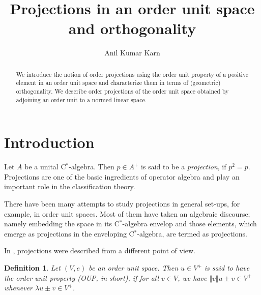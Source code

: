 \documentclass[12pt]{amsart}
\newtheorem{definition}[theorem]{Definition}
\begin{document}
	
\title[Projections and orthogonality]{Projections in an order unit space and orthogonality}
\author{Anil Kumar Karn}
	
\address{School of Mathematical Sciences, National Institute of Science Education and Research Bhubaneswar, An OCC of Homi Bhabha National Institute, P.O. - Jatni, District - Khurda, Odisha - 752050, India.}

\email{\textcolor[rgb]{0.00,0.00,0.84}{anilkarn@niser.ac.in}}

	
	
	
\begin{abstract}
	We introduce the notion of order projections using the order unit property of a positive element in an order unit space and characterize them in terms of (geometric) orthogonality. We describe order projections of the order unit space obtained by adjoining an order unit to a normed linear space.
\end{abstract}

\maketitle 

\section{Introduction} 

Let $A$ be a unital C$^*$-algebra. Then $p \in A^+$ is said to be a \emph{projection}, if $p^2 = p$. Projections are one of the basic ingredients of operator algebra and play an important role in the classification theory. %

There have been many attempts to study projections in general set-ups, for example, in order unit spaces. Most of them have taken an algebraic discourse; namely embedding the space in its C$^*$-algebra envelop and those elements, which emerge as projections in the enveloping C$^*$-algebra, are termed as projections. 

In \cite{K4}, projections were described from a different point of view. 
\begin{definition}
	Let $(V, e)$ be an order unit space. Then $u \in V^+$ is said to have the \emph{order unit property} (OUP, in short), if for all $v \in V$, we have $\Vert v \Vert u \pm v \in V^+$ whenever $\lambda u \pm v \in V^+$. 
\end{definition}
\end{document}
